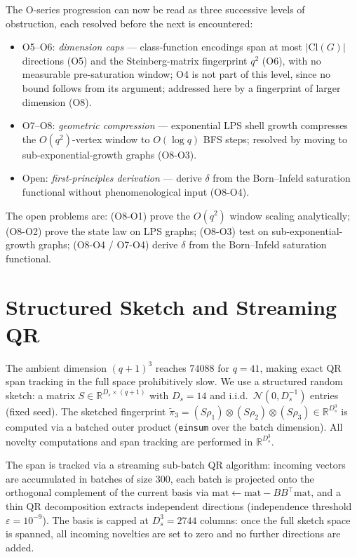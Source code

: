 \documentclass[11pt,a4paper]{article}
\theoremstyle{definition}
\theoremstyle{remark}
\newcommand{\R}{\mathbb{R}}
\begin{document}
  The O-series progression can now be read as three successive levels of obstruction,
  each resolved before the next is encountered:
  \begin{itemize}[nosep]
  \item O5--O6: \emph{dimension caps} — class-function encodings span at most $|\mathrm{Cl}(G)|$
  directions (O5) and the Steinberg-matrix fingerprint $q^2$ (O6), with no measurable
  pre-saturation window; O4 is not part of this level, since no bound follows from its argument;
  addressed here by a fingerprint of larger dimension (O8).
  \item O7--O8: \emph{geometric compression} — exponential LPS shell growth
  compresses the $O(q^2)$-vertex window to $O(\log q)$ BFS steps;
  resolved by moving to sub-exponential-growth graphs (O8-O3).
  \item Open: \emph{first-principles derivation} — derive $\delta$ from the
  Born--Infeld saturation functional without phenomenological input (O8-O4).
  \end{itemize}
  The open problems are: (O8-O1) prove the $O(q^2)$ window scaling analytically;
  (O8-O2) prove the state law on LPS graphs; (O8-O3) test on sub-exponential-growth
  graphs; (O8-O4 / O7-O4) derive $\delta$ from the Born--Infeld saturation
  functional.

  \appendix

  \section{Structured Sketch and Streaming QR}
  \label{app:algo}

  The ambient dimension $(q+1)^3$ reaches $74088$ for $q=41$, making exact QR
  span tracking in the full space prohibitively slow.
  We use a structured random sketch: a matrix $S \in \R^{D_s \times (q+1)}$ with
  $D_s = 14$ and i.i.d.\ $\mathcal{N}(0, D_s^{-1})$ entries (fixed seed).
  The sketched fingerprint $\tilde\pi_3 = (S\rho_1) \otimes (S\rho_2) \otimes (S\rho_3)
  \in \R^{D_s^3}$ is computed via a batched outer product
  (\texttt{einsum} over the batch dimension).
  All novelty computations and span tracking are performed in $\R^{D_s^3}$.

  The span is tracked via a streaming sub-batch QR algorithm: incoming vectors are
  accumulated in batches of size 300, each batch is projected onto the orthogonal
  complement of the current basis via $\mathrm{mat} \leftarrow \mathrm{mat} - BB^\top\mathrm{mat}$,
  and a thin QR decomposition extracts independent directions (independence threshold
  $\varepsilon = 10^{-9}$).
  The basis is capped at $D_s^3 = 2744$ columns: once the full sketch space is spanned,
  all incoming novelties are set to zero and no further directions are added.
\end{document}
